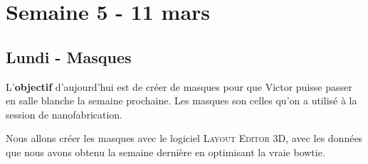 \section{Semaine 5 - 11 mars}

\subsection{Lundi - Masques}

L'\textbf{objectif} d'aujourd'hui est de créer de masques
pour que Victor puisse passer en salle blanche la semaine
prochaine. Les masques son celles qu'on a utilisé à la
session de nanofabrication. 

Nous allons créer les masques avec le logiciel 
\textsc{Layout Editor 3D}, avec les données que 
nous avons obtenu la semaine dernière en optimisant
la vraie bowtie.

